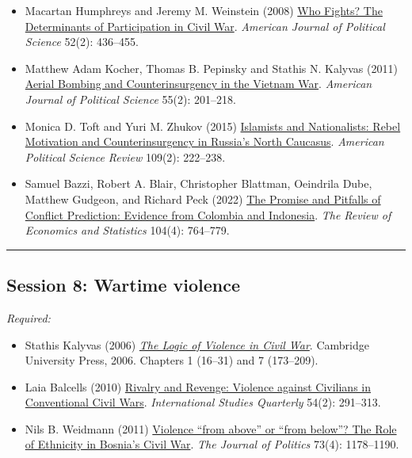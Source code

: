 \documentclass[12pt, a4paper]{article}
\begin{document}
\begin{itemize}
	\item Macartan Humphreys and Jeremy M. Weinstein (2008) \href{https://doi.org/10.1111/j.1540-5907.2008.00322.x}{Who Fights? The Determinants of Participation in Civil War}. \textit{American Journal of Political Science} 52(2): 436--455.
	\item Matthew Adam Kocher, Thomas B. Pepinsky and Stathis N. Kalyvas (2011) \href{https://doi.org/10.1111/j.1540-5907.2010.00498.x}{Aerial Bombing and Counterinsurgency in the Vietnam War}. \textit{American Journal of Political Science} 55(2): 201--218.
	\item Monica D. Toft and Yuri M. Zhukov (2015) \href{https://doi.org/10.1017/S000305541500012X}{Islamists and Nationalists: Rebel Motivation and Counterinsurgency in Russia's North Caucasus}. \textit{American Political Science Review} 109(2): 222--238.
  \item Samuel Bazzi, Robert A. Blair, Christopher Blattman, Oeindrila Dube, Matthew Gudgeon, and Richard Peck (2022) \href{https://doi.org/10.1162/rest_a_01016}{The Promise and Pitfalls of Conflict Prediction: Evidence from Colombia and Indonesia}. \textit{The Review of Economics and Statistics} 104(4): 764--779.
\end{itemize}


\vspace{20pt}
\hrule
\subsection*{Session 8: Wartime violence}

\noindent\textit{Required:}

\begin{itemize}
  \item Stathis Kalyvas (2006) \href{https://bibliotecas.uc3m.es/permalink/f/1nggclj/34UC3M_ALMA21161986050004213}{\textit{The Logic of Violence in Civil War}}. Cambridge University Press, 2006. Chapters 1 (16--31) and 7 (173--209).
  \item Laia Balcells (2010) \href{https://doi.org/10.1111/j.1468-2478.2010.00588.x}{Rivalry and Revenge: Violence against Civilians in Conventional Civil Wars}. \textit{International Studies Quarterly} 54(2): 291--313.
  \item Nils B. Weidmann (2011) \href{https://doi.org/10.1017/S0022381611000831}{Violence ``from above'' or ``from below''? The Role of Ethnicity in Bosnia’s Civil War}. \textit{The Journal of Politics} 73(4): 1178--1190.
\end{itemize}
\end{document}
